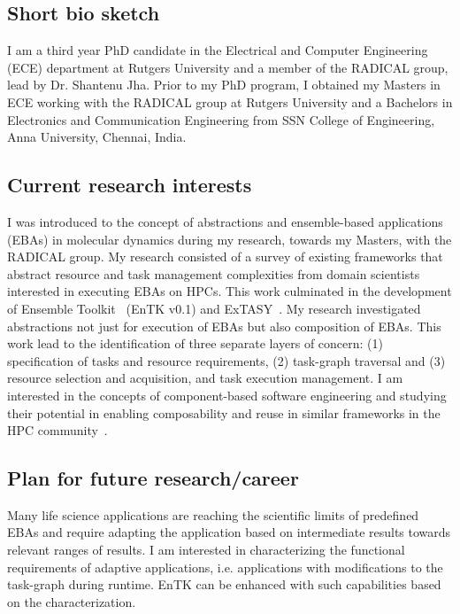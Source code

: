 \subsection{Short bio sketch}
I am a third year PhD candidate in the Electrical and Computer Engineering (ECE)
department at Rutgers University and a member of the RADICAL group, lead by 
Dr. Shantenu Jha. Prior to my PhD program, I obtained my Masters in ECE working 
with the RADICAL group at Rutgers University and a Bachelors in Electronics and 
Communication Engineering from SSN College of Engineering, Anna University, 
Chennai, India.

\subsection{Current research interests}
I was introduced to the concept of abstractions and ensemble-based applications
(EBAs) in molecular dynamics during my research, towards my Masters, with the 
RADICAL group. My research consisted of a survey of existing frameworks that 
abstract resource and task management complexities from domain scientists
interested in executing EBAs on HPCs. This work culminated in the development of
Ensemble Toolkit~\cite{entk} (EnTK v0.1) and ExTASY~\cite{extasy}. My research 
investigated abstractions not just for execution of EBAs but also composition
of EBAs. This work lead to the identification of three separate layers of 
concern: (1) specification of tasks and resource requirements, (2) task-graph 
traversal and (3) resource selection and acquisition, and task execution 
management. I am interested in the concepts of component-based software 
engineering and studying their potential in enabling composability and reuse in 
similar frameworks in the HPC community~\cite{review_bb_2016}.

\subsection{Plan for future research/career}
Many life science applications are reaching the scientific limits of predefined
EBAs and require adapting the application based on intermediate results towards
relevant ranges of results. I am interested in characterizing the functional 
requirements of adaptive applications, i.e. applications with modifications to 
the task-graph during runtime. EnTK can be enhanced with such capabilities
based on the characterization.

